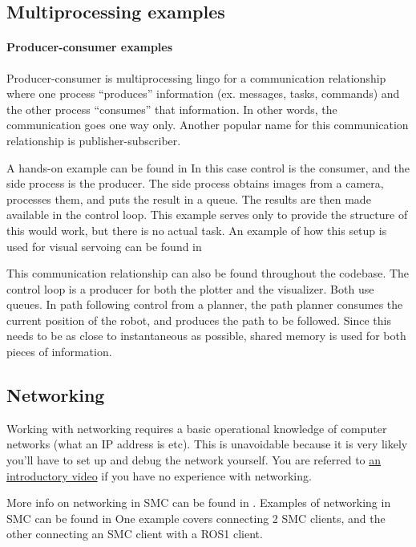 \subsection{Multiprocessing examples}
\paragraph{Producer-consumer examples}
Producer-consumer is multiprocessing lingo for a communication
relationship where one process ``produces'' information (ex. messages, tasks,
commands) and the other process ``consumes'' that information.
In other words, the communication goes one way only.
Another popular name for this communication relationship is publisher-subscriber.

A hands-on example can be found in
In this case control is the consumer, and the side process is the producer.
The side process obtains images from a camera, processes them,
and puts the result in a queue. The results are then made available
in the control loop. This example serves only to provide
the structure of this would work, but there is no actual task.
An example of how this setup is used 
for visual servoing can be found in

This communication relationship can also be found throughout the codebase.
The control loop is a producer for both the plotter
and the visualizer. Both use queues. 
In path following control from a planner, the path planner consumes
the current position of the robot, and produces the path to be followed.
Since this needs to be as close to instantaneous as possible,
shared memory is used for both pieces of information.


\subsection{Networking}
Working with networking requires a basic operational knowledge of computer
networks (what an IP address is etc). This is unavoidable
because it is very likely you'll have to set up and debug the network yourself.
You are referred to 
\href{https://www.youtube.com/watch?v=0Hhaf4q3eqI}{an introductory video} 
if you have no experience with networking.

More info on networking in SMC can be found in 
\newline
{}.
Examples of networking in SMC can be found in 
\newline
{}
One example covers connecting 2 SMC clients, and the other connecting 
an SMC client with a ROS1 client.




